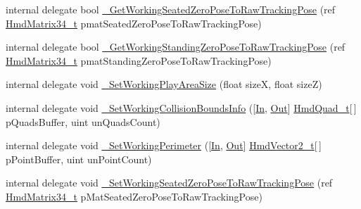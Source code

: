 \begin{DoxyCompactItemize}
\item 
internal delegate bool \mbox{\hyperlink{struct_valve_1_1_v_r_1_1_i_v_r_chaperone_setup_af9e02f945345cc16c02e09a55ae07afa}{\+\_\+\+Get\+Working\+Seated\+Zero\+Pose\+To\+Raw\+Tracking\+Pose}} (ref \mbox{\hyperlink{struct_valve_1_1_v_r_1_1_hmd_matrix34__t}{Hmd\+Matrix34\+\_\+t}} pmat\+Seated\+Zero\+Pose\+To\+Raw\+Tracking\+Pose)
\item 
internal delegate bool \mbox{\hyperlink{struct_valve_1_1_v_r_1_1_i_v_r_chaperone_setup_a45b2110871b615dbde696e6f11cfedba}{\+\_\+\+Get\+Working\+Standing\+Zero\+Pose\+To\+Raw\+Tracking\+Pose}} (ref \mbox{\hyperlink{struct_valve_1_1_v_r_1_1_hmd_matrix34__t}{Hmd\+Matrix34\+\_\+t}} pmat\+Standing\+Zero\+Pose\+To\+Raw\+Tracking\+Pose)
\item 
internal delegate void \mbox{\hyperlink{struct_valve_1_1_v_r_1_1_i_v_r_chaperone_setup_a554b0b7e6b9be23e238594f517ed9890}{\+\_\+\+Set\+Working\+Play\+Area\+Size}} (float sizeX, float sizeZ)
\item 
internal delegate void \mbox{\hyperlink{struct_valve_1_1_v_r_1_1_i_v_r_chaperone_setup_a1826d10332305d4c90afaf2949c8b5ce}{\+\_\+\+Set\+Working\+Collision\+Bounds\+Info}} (\mbox{[}\mbox{\hyperlink{namespace_valve_1_1_v_r_a1e6192cb5ddaf204afab87ccb5728780aefeb369cccbd560588a756610865664c}{In}}, \mbox{\hyperlink{namespace_valve_1_1_v_r_a1e6192cb5ddaf204afab87ccb5728780a7c147cda9e49590f6abe83d118b7353b}{Out}}\mbox{]} \mbox{\hyperlink{struct_valve_1_1_v_r_1_1_hmd_quad__t}{Hmd\+Quad\+\_\+t}}\mbox{[}$\,$\mbox{]} p\+Quads\+Buffer, uint un\+Quads\+Count)
\item 
internal delegate void \mbox{\hyperlink{struct_valve_1_1_v_r_1_1_i_v_r_chaperone_setup_ad35ac33bfa800e014d9b1a6bac63e1db}{\+\_\+\+Set\+Working\+Perimeter}} (\mbox{[}\mbox{\hyperlink{namespace_valve_1_1_v_r_a1e6192cb5ddaf204afab87ccb5728780aefeb369cccbd560588a756610865664c}{In}}, \mbox{\hyperlink{namespace_valve_1_1_v_r_a1e6192cb5ddaf204afab87ccb5728780a7c147cda9e49590f6abe83d118b7353b}{Out}}\mbox{]} \mbox{\hyperlink{struct_valve_1_1_v_r_1_1_hmd_vector2__t}{Hmd\+Vector2\+\_\+t}}\mbox{[}$\,$\mbox{]} p\+Point\+Buffer, uint un\+Point\+Count)
\item 
internal delegate void \mbox{\hyperlink{struct_valve_1_1_v_r_1_1_i_v_r_chaperone_setup_a5190c3da2ff9e625deae3ebdb2deeb0b}{\+\_\+\+Set\+Working\+Seated\+Zero\+Pose\+To\+Raw\+Tracking\+Pose}} (ref \mbox{\hyperlink{struct_valve_1_1_v_r_1_1_hmd_matrix34__t}{Hmd\+Matrix34\+\_\+t}} p\+Mat\+Seated\+Zero\+Pose\+To\+Raw\+Tracking\+Pose)
\item 

\end{DoxyCompactItemize}
